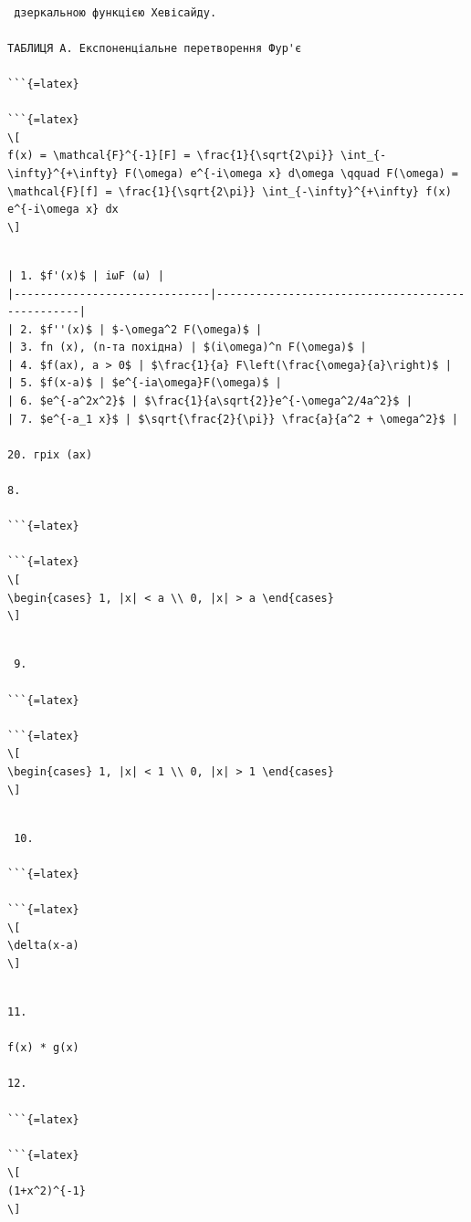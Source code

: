 \documentclass[
]{article}
\begin{document}
\begin{verbatim}

 дзеркальною функцією Хевісайду.

ТАБЛИЦЯ A. Експоненціальне перетворення Фур'є

```{=latex}

```{=latex}
\[
f(x) = \mathcal{F}^{-1}[F] = \frac{1}{\sqrt{2\pi}} \int_{-\infty}^{+\infty} F(\omega) e^{-i\omega x} d\omega \qquad F(\omega) = \mathcal{F}[f] = \frac{1}{\sqrt{2\pi}} \int_{-\infty}^{+\infty} f(x) e^{-i\omega x} dx
\]
\end{verbatim}

\begin{verbatim}

| 1. $f'(x)$ | iωF (ω) |
|------------------------------|-------------------------------------------------|
| 2. $f''(x)$ | $-\omega^2 F(\omega)$ |
| 3. fn (x), (n-та похідна) | $(i\omega)^n F(\omega)$ |
| 4. $f(ax), a > 0$ | $\frac{1}{a} F\left(\frac{\omega}{a}\right)$ |
| 5. $f(x-a)$ | $e^{-ia\omega}F(\omega)$ |
| 6. $e^{-a^2x^2}$ | $\frac{1}{a\sqrt{2}}e^{-\omega^2/4a^2}$ |
| 7. $e^{-a_1 x}$ | $\sqrt{\frac{2}{\pi}} \frac{a}{a^2 + \omega^2}$ |

20. гріх (ax)

8.

```{=latex}

```{=latex}
\[
\begin{cases} 1, |x| < a \\ 0, |x| > a \end{cases}
\]
\end{verbatim}

\begin{verbatim}

 9.

```{=latex}

```{=latex}
\[
\begin{cases} 1, |x| < 1 \\ 0, |x| > 1 \end{cases}
\]
\end{verbatim}

\begin{verbatim}

 10.

```{=latex}

```{=latex}
\[
\delta(x-a)
\]
\end{verbatim}

\begin{verbatim}

11.

f(x) * g(x)

12.

```{=latex}

```{=latex}
\[
(1+x^2)^{-1}
\]
\end{verbatim}
\end{document}
